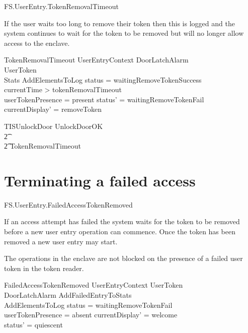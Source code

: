 \begin{traceunit}{FS.UserEntry.TokenRemovalTimeout}
\end{traceunit}

If the user waits too long to remove their token then this is logged
and the system continues to wait for the token to be removed but will
no longer allow access to the enclave.

\begin{schema}{TokenRemovalTimeout}
        UserEntryContext
\also
        \Xi DoorLatchAlarm
\\      \Xi UserToken
\\      \Xi Stats       
\also
        AddElementsToLog
\where
        status = waitingRemoveTokenSuccess
\\      currentTime > tokenRemovalTimeout 
\\      userTokenPresence = present
\also
        status' = waitingRemoveTokenFail
\\      currentDisplay' = removeToken
\end{schema}


\begin{zed}
        TISUnlockDoor  UnlockDoorOK 
\\      \t2 \lor [ WaitingTokenRemoval |status =
waitingRemoveTokenSuccess ]
\\      \t2 \lor TokenRemovalTimeout
\end{zed}
 
\section{Terminating a failed access}

\begin{traceunit}{FS.UserEntry.FailedAccessTokenRemoved}
\end{traceunit}

If an access attempt has failed the system waits for the token to be
removed before a new user entry operation can commence. Once the token has been
removed a new user entry may start.

The operations in the enclave are not blocked on the presence of a
failed user token in the token reader. 

\begin{schema}{FailedAccessTokenRemoved}
        UserEntryContext
\also
	\Xi UserToken
\\      \Xi DoorLatchAlarm
\also
        AddFailedEntryToStats
\\      AddElementsToLog
\where
        status = waitingRemoveTokenFail
\\      userTokenPresence = absent
\also
        currentDisplay' = welcome
\\      status' = quiescent
\end{schema}

